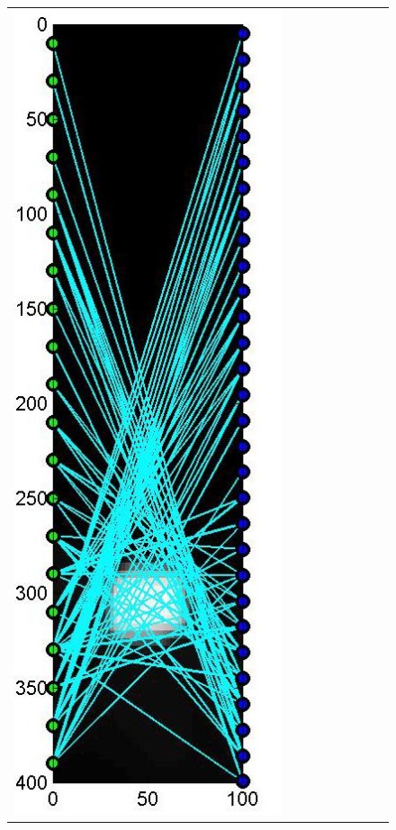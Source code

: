 \documentclass[english]{siamltex}
\begin{document}
{\begin{figure}[!h]
\begin{center}
\begin{tabular}{|c|c|c|c|c|c|c|c|c|}
			\includegraphics[width=.9\iwidth]{figures/newFigs/noisy/resultsExp-7-designs}
			&

\end{tabular}
\end{center}
\end{figure}}
\end{document}
